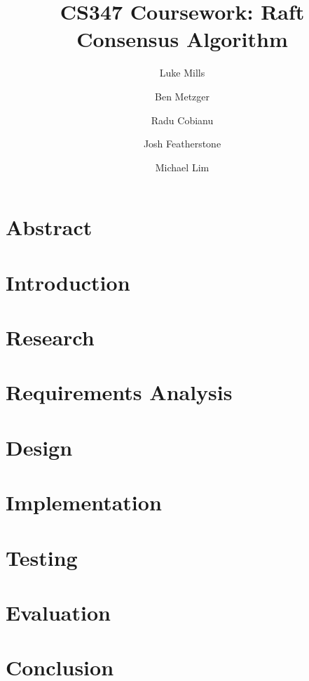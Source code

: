 \documentclass{article}
\title{CS347 Coursework: Raft Consensus Algorithm}
\author{Luke Mills \and Ben Metzger \and Radu Cobianu \and Josh Featherstone \and Michael Lim}
\begin{document}
\maketitle

\section{Abstract}

\section{Introduction}

\section{Research}

\section{Requirements Analysis}

\section{Design}

\section{Implementation}

\section{Testing}

\section{Evaluation}

\section{Conclusion}



\end{document}
